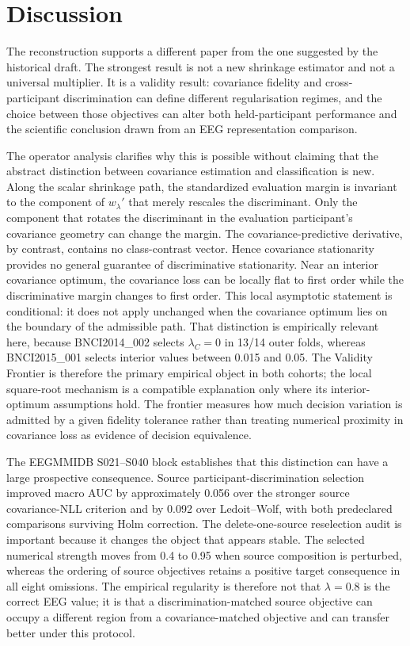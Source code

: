 \section{Discussion}

The reconstruction supports a different paper from the one suggested by the
historical draft. The strongest result is not a new shrinkage estimator and
not a universal multiplier. It is a validity result: covariance fidelity and
cross-participant discrimination can define different regularisation regimes,
and the choice between those objectives can alter both held-participant
performance and the scientific conclusion drawn from an EEG representation
comparison.

The operator analysis clarifies why this is possible without claiming that
the abstract distinction between covariance estimation and classification is
new. Along the scalar shrinkage path, the standardized evaluation margin is
invariant to the component of \(w_\lambda'\) that merely rescales the
discriminant. Only the component that rotates the discriminant in the
evaluation participant's covariance geometry can change the margin. The
covariance-predictive derivative, by contrast, contains no class-contrast
vector. Hence covariance stationarity provides no general guarantee of
discriminative stationarity. Near an interior covariance optimum, the
covariance loss can be locally flat to first order while the discriminative
margin changes to first order. This local asymptotic statement is conditional:
it does not apply unchanged when the covariance optimum lies on the boundary
of the admissible path. That distinction is empirically relevant here,
because BNCI2014\_002 selects \(\lambda_C=0\) in 13/14 outer folds,
whereas BNCI2015\_001 selects interior values between 0.015 and 0.05. The
Validity Frontier is therefore the primary empirical object in both cohorts;
the local square-root mechanism is a compatible explanation only where its
interior-optimum assumptions hold. The frontier measures how much decision
variation is admitted by a given fidelity tolerance rather than treating
numerical proximity in covariance loss as evidence of decision equivalence.

The EEGMMIDB S021--S040 block establishes that this distinction can have a
large prospective consequence. Source participant-discrimination selection
improved macro AUC by approximately 0.056 over the stronger source
covariance-NLL criterion and by 0.092 over Ledoit--Wolf, with both predeclared
comparisons surviving Holm correction. The delete-one-source reselection
audit is important because it changes the object that appears stable. The
selected numerical strength moves from 0.4 to 0.95 when source composition is
perturbed, whereas the ordering of source objectives retains a positive target
consequence in all eight omissions. The empirical regularity is therefore not
that \(\lambda=0.8\) is the correct EEG value; it is that a
discrimination-matched source objective can occupy a different region from a
covariance-matched objective and can transfer better under this protocol.

